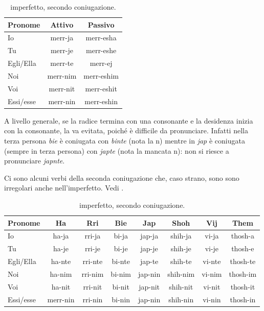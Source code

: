 \begin{table}[H]
    \centering
    \begin{tabular}{lcc}
        \toprule
        Pronome     &   Attivo & Passivo \\
        \midrule
        Io          &   merr-ja & merr-esha \\
        Tu          &   merr-je & merr-eshe \\
        Egli/Ella   &   merr-te & merr-ej \\
        Noi         &   merr-nim & merr-eshim \\
        Voi         &   merr-nit & merr-eshit \\
        Essi/esse   &   merr-nin & merr-eshin \\
        \bottomrule
    \end{tabular}
    \caption{imperfetto, secondo coniugazione.}
    \label{tbl:verb:primaconiugazione:imperfetto}
\end{table}

A livello generale, se la radice termina con una consonante e la desidenza inizia con la consonante, la  va evitata, poiché è difficile da pronunciare. Infatti nella terza persona \textit{bie} è coniugata con \textit{binte} (nota la n) mentre in \textit{jap} è coniugata (sempre in terza persona) con \textit{japte} (nota la mancata n): non si riesce a pronunciare \textit{japnte}.

Ci sono alcuni verbi della seconda coniugazione che, caso strano, sono sono irregolari anche nell'imperfetto. Vedi .

\begin{table}[H]
    \centering
    \begin{tabular}{lccccccc}
        \toprule
        Pronome     &   Ha      & Rri   & Bie   & Jap   & Shoh      & Vij   & Them \\
        \midrule
        Io          &   ha-ja & rri-ja & bi-ja & jap-ja & shih-ja & vi-ja & thosh-a \\
        Tu          &   ha-je & rri-je & bi-je & jap-je & shih-je & vi-je & thosh-e \\
        Egli/Ella   &   ha-nte & rri-nte & bi-nte & jap-te & shih-te & vi-nte & thosh-te \\
        Noi         &   ha-nim & rri-nim & bi-nim & jap-nin & shih-nim & vi-nim & thosh-im \\
        Voi         &   ha-nit & rri-nit & bi-nit & jap-nit & shih-nit & vi-nit & thosh-it \\
        Essi/esse   &   merr-nin & rri-nin & bi-nin & jap-nin & shih-nin & vi-nin & thosh-in \\
        \bottomrule
    \end{tabular}
    \caption{imperfetto, secondo coniugazione.}
    \label{tbl:verb:secondaconiugazione:imperfetto}
\end{table}

